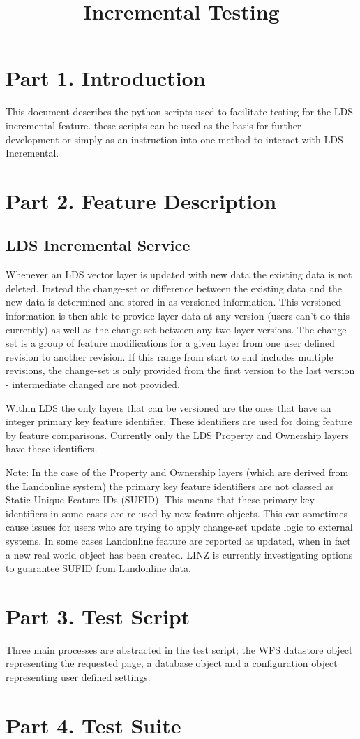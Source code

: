\documentclass[a4paper]{report}
\title{Incremental Testing}
\begin{document}
\maketitle

\section*{Part 1. Introduction}

This document describes the python scripts used to facilitate testing for the LDS incremental feature. these scripts can be used as the basis for further development or simply as an instruction into one method to interact with LDS Incremental.

\section{Part 2. Feature Description}

\subsection*{LDS Incremental Service}
Whenever an LDS vector layer is updated with new data the existing data is not deleted. Instead the change-set or difference between the existing data and the new data is determined and stored in as versioned information. This versioned information is then able to provide layer data at any version (users can’t do this currently) as well as the change-set between any two layer versions. The change-set is a group of feature modifications for a given layer from one user defined revision to another revision. If this range from start to end includes multiple revisions, the change-set is only provided from the first version to the last version - intermediate changed are not provided. 

Within LDS the only layers that can be versioned are the ones that have an integer primary key feature identifier.  These identifiers are used for doing feature by feature comparisons. Currently only the LDS Property and Ownership layers have these identifiers. 

Note: In the case of the Property and Ownership layers (which are derived from the Landonline system) the primary key feature identifiers are not classed as Static Unique Feature IDs (SUFID). This means that these primary key identifiers in some cases are re-used by new feature objects. This can sometimes cause issues for users who are trying to apply change-set update logic to external systems. In some cases Landonline feature are reported as updated, when in fact a new real world object has been created. LINZ is currently investigating options to guarantee SUFID from Landonline data.

\section*{Part 3. Test Script}
Three main processes are abstracted in the test script; the WFS datastore object representing the requested page, a database object and a configuration object representing user defined settings.

\section*{Part 4. Test Suite} 
\end{document}
